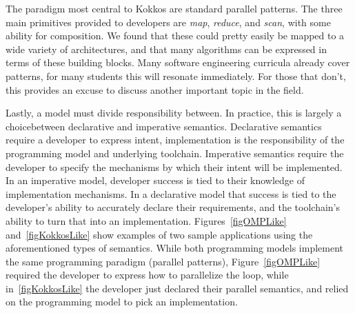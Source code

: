 

The paradigm most central to Kokkos are standard parallel patterns. The three main primitives provided to developers are \emph{map}, \emph{reduce}, and \emph{scan}, with some ability for composition. We found that these could pretty easily be mapped to a wide variety of architectures, and that many algorithms can be expressed in terms of these building blocks. Many software engineering curricula already cover patterns, for many students this will resonate immediately. For those that don't, this provides an excuse to discuss another important topic in the field.

Lastly, a model must divide responsibility between. In practice, this is largely a choicebetween declarative and imperative semantics. Declarative semantics require a developer to express intent, implementation is the responsibility of the programming model and underlying toolchain. Imperative semantics require the developer to specify the mechanisms by which their intent will be implemented. In an imperative model, developer success is tied to their knowledge of implementation mechanisms. In a declarative model that success is tied to the developer's ability to accurately declare their requirements, and the toolchain's ability to turn that into an implementation. Figures~\ref{figOMPLike} and~\ref{figKokkosLike} show examples of two sample applications using the aforementioned types of semantics. While both programming models implement the same programming paradigm (parallel patterns), Figure~\ref{figOMPLike} required the developer to express how to parallelize the loop, while in~\ref{figKokkosLike} the developer just declared their parallel semantics, and relied on the programming model to pick an implementation. 

